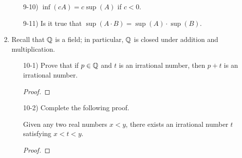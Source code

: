 \documentclass[11pt,a4paper]{article}
\begin{document}
\begin{enumerate}
\begin{enumerate}
        \item[9-10)] \( \inf(cA) = c \sup (A) \) if \( c < 0  \).
        \item[9-11)] Is it true that \( \sup(A \cdot B) = \sup(A) \cdot \sup(B) \).
    \end{enumerate}
\item Recall that \( \mathbb{Q}  \) is a field; in particular, \( \mathbb{Q}  \) is closed under addition and multiplication. 
    \begin{enumerate}
        \item[10-1)] Prove that if \( p \in \mathbb{Q}  \) and \( t \) is an irrational number, then \(  p + t  \) is an irrational number.
            \begin{proof}
            
            \end{proof}
        \item[10-2)] Complete the following proof.
            \begin{theorem}
                Given any two real numbers \( x < y  \), there exists an irrational number \( t  \) satisfying \( x < t < y  \).
            \end{theorem}
            \begin{proof}
            
            \end{proof}
    \end{enumerate}
\end{enumerate}
\end{document}
